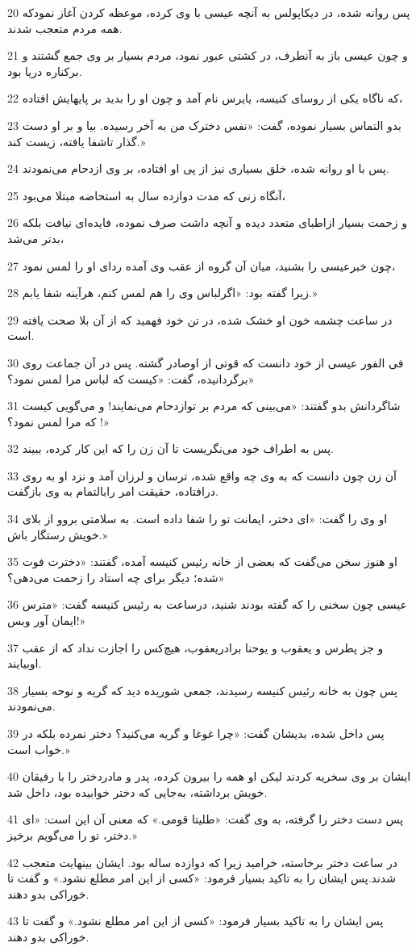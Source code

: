 \par 20 پس روانه شده، در دیکاپولس به آنچه عیسی با وی کرده، موعظه کردن آغاز نمودکه همه مردم متعجب شدند.
\par 21 و چون عیسی باز به آنطرف، در کشتی عبور نمود، مردم بسیار بر وی جمع گشتند و برکناره دریا بود.
\par 22 که ناگاه یکی از روسای کنیسه، یایرس نام آمد و چون او را بدید بر پایهایش افتاده،
\par 23 بدو التماس بسیار نموده، گفت: «نفس دخترک من به آخر رسیده. بیا و بر او دست گذار تاشفا یافته، زیست کند.»
\par 24 پس با او روانه شده، خلق بسیاری نیز از پی او افتاده، بر وی ازدحام می‌نمودند.
\par 25 آنگاه زنی که مدت دوازده سال به استحاضه مبتلا می‌بود،
\par 26 و زحمت بسیار ازاطبای متعدد دیده و آنچه داشت صرف نموده، فایده‌ای نیافت بلکه بدتر می‌شد،
\par 27 چون خبرعیسی را بشنید، میان آن گروه از عقب وی آمده ردای او را لمس نمود،
\par 28 زیرا گفته بود: «اگرلباس وی را هم لمس کنم، هرآینه شفا یابم.»
\par 29 در ساعت چشمه خون او خشک شده، در تن خود فهمید که از آن بلا صحت یافته است.
\par 30 فی الفور عیسی از خود دانست که قوتی از اوصادر گشته. پس در آن جماعت روی برگردانیده، گفت: «کیست که لباس مرا لمس نمود؟»
\par 31 شاگردانش بدو گفتند: «می‌بینی که مردم بر توازدحام می‌نمایند! و می‌گویی کیست که مرا لمس نمود؟ !»
\par 32 پس به اطراف خود می‌نگریست تا آن زن را که این کار کرده، ببیند.
\par 33 آن زن چون دانست که به وی چه واقع شده، ترسان و لرزان آمد و نزد او به روی در‌افتاده، حقیقت امر رابالتمام به وی باز‌گفت.
\par 34 او وی را گفت: «ای دختر، ایمانت تو را شفا داده است. به سلامتی بروو از بلای خویش رستگار باش.»
\par 35 او هنوز سخن می‌گفت که بعضی از خانه رئیس کنیسه آمده، گفتند: «دخترت فوت شده؛ دیگر برای چه استاد را زحمت می‌دهی؟»
\par 36 عیسی چون سخنی را که گفته بودند شنید، درساعت به رئیس کنیسه گفت: «مترس ایمان آور وبس!»
\par 37 و جز پطرس و یعقوب و یوحنا برادریعقوب، هیچ‌کس را اجازت نداد که از عقب اوبیایند.
\par 38 پس چون به خانه رئیس کنیسه رسیدند، جمعی شوریده دید که گریه و نوحه بسیار می‌نمودند.
\par 39 پس داخل شده، بدیشان گفت: «چرا غوغا و گریه می‌کنید؟ دختر نمرده بلکه در خواب است.»
\par 40 ایشان بر وی سخریه کردند لیکن او همه را بیرون کرده، پدر و مادردختر را با رفیقان خویش برداشته، به‌جایی که دختر خوابیده بود، داخل شد.
\par 41 پس دست دختر را گرفته، به وی گفت: «طلیتا قومی.» که معنی آن این است: «ای دختر، تو را می‌گویم برخیز.»
\par 42 در ساعت دختر برخاسته، خرامید زیرا که دوازده ساله بود. ایشان بینهایت متعجب شدند.پس ایشان را به تاکید بسیار فرمود: «کسی از این امر مطلع نشود.» و گفت تا خوراکی بدو دهند.
\par 43 پس ایشان را به تاکید بسیار فرمود: «کسی از این امر مطلع نشود.» و گفت تا خوراکی بدو دهند.

